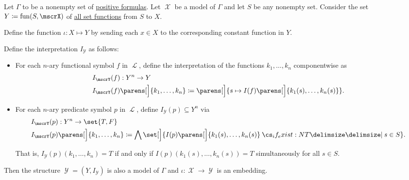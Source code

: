\begin{proposition}\label{thm:functions_over_model_form_model}
  Let \( \Gamma \) to be a nonempty set of \hyperref[def:positive_formula]{positive formulas}. Let \( \mscrX \) be a model of \( \Gamma \) and let \( S \) be any nonempty set. Consider the set \( Y \coloneqq \fun(S, \mscrX) \) of \hyperref[def:function]{all set functions} from \( S \) to \( X \).

  Define the function \( \iota: X \mapsto Y \) by sending each \( x \in X \) to the corresponding constant function in \( Y \).

  Define the interpretation \( I_\mscrY \) as follows:
  \begin{itemize}
    \item For each \( n \)-ary functional symbol \( f \) in \( \mscrL \), define the interpretation of the functions \( k_1, \ldots, k_n \) componentwise as
    \begin{equation*}
      \begin{aligned}
        &I_\mscrY(f): Y^n \to Y \\
        &I_\mscrY(f) \parens[\Big]{ k_1, \ldots, k_n } \coloneqq \parens[\Big]{ s \mapsto I(f) \parens[\Big]{ k_1(s), \ldots, k_n(s) } }.
      \end{aligned}
    \end{equation*}

    \item For each \( n \)-ary predicate symbol \( p \) in \( \mscrL \), define \( I_\mscrY(p) \subseteq Y^n \) via
    \begin{equation*}
      \begin{aligned}
        &I_\mscrY(p): Y^n \to \set{ T, F } \\
        &I_\mscrY(p) \parens[\Big]{ k_1, \ldots, k_n } \coloneqq \bigwedge \set[\Big]{ I(p) \parens[\Big]{ k_1(s), \ldots, k_n(s) } \given* s \in S }.
      \end{aligned}
    \end{equation*}

    That is, \( I_\mscrY(p) (k_1, \ldots, k_n) = T \) if and only if \( I(p) (k_1(s), \ldots, k_n(s)) = T \) simultaneously for all \( s \in S \).
  \end{itemize}

  Then the structure \( \mscrY = (Y, I_\mscrY) \) is also a model of \( \Gamma \) and \( \iota: \mscrX \to \mscrY \) is an embedding.
\end{proposition}
